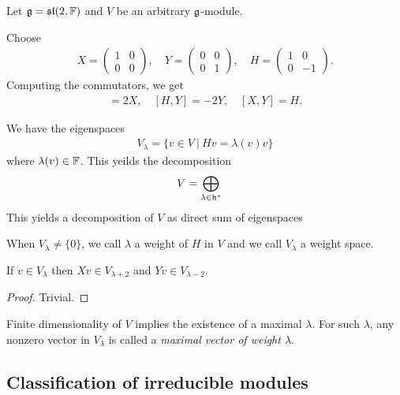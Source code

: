 Let $\mathfrak{g}=\mathfrak{sl}(2,\mathbb{F})$ and $V$ be an arbitrary $\mathfrak{g}$-module.

Choose
\begin{align}
    X = \begin{pmatrix} 1 & 0 \\ 0 & 0 \end{pmatrix}, \quad
    Y = \begin{pmatrix} 0 & 0 \\ 0 & 1 \end{pmatrix}, \quad
    H = \begin{pmatrix} 1 & 0 \\ 0 & -1 \end{pmatrix}.
\end{align}
Computing the commutators, we get
\begin{align}
    [H,X] = 2X,\quad [H,Y]=-2Y,\quad [X,Y]=H.
\end{align}

We have the eigenspaces
\begin{align}
    V_\lambda = \{v\in V\ |\ H v = \lambda(v) v\}
\end{align}
where $\lambda(v)\in \mathbb{F}$. This yeilds the decomposition
\begin{align}
    V &= \bigoplus_{\lambda\in \mathfrak{h}^*} 
\end{align}
This yields a decomposition of $V$ as direct sum of eigenspaces 

When $V_\lambda \neq \{0\}$, we call $\lambda$ a weight of $H$ in $V$ and we call $V_\lambda$ a weight space.

\begin{lemma}
    If $v\in V_\lambda$ then $Xv \in V_{\lambda + 2}$ and $Yv\in V_{\lambda-2}$.
\end{lemma}
\begin{proof} Trivial.
\end{proof}
Finite dimensionality of $V$ implies the existence of a maximal $\lambda$. For such $\lambda$, any nonzero vector in $V_\lambda$ is called a \emph{maximal vector of weight $\lambda$}.

\subsection{Classification of irreducible modules}
\label{sub:classification_of_irreducible_modules}

